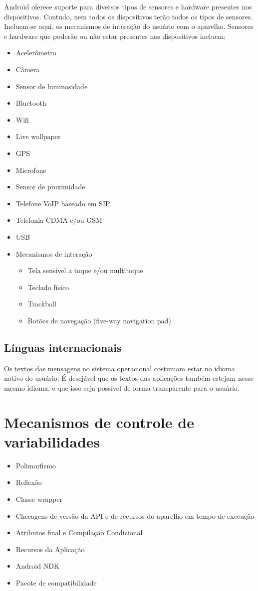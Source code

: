 Android oferece suporte para diversos tipos de sensores e hardware presentes nos 
dispositivos. Contudo, nem todos os dispositivos terão todos os tipos de sensores.
Incluem-se aqui, os mecanismos de interação do usuário com o aparelho.
Sensores e hardware que poderão ou não estar presentes nos dispositivos incluem:
\begin{itemize}
    \item Acelerômetro
    \item Câmera
    \item Sensor de luminosidade
    \item Bluetooth
    \item Wifi
    \item Live wallpaper
    \item GPS
    \item Microfone
    \item Sensor de proximidade
    \item Telefone VoIP baseado em SIP
    \item Telefonia CDMA e/ou GSM
    \item USB
    \item Mecanismos de interação
    \begin{itemize}
        \item Tela sensível a toque e/ou multitoque
        \item Teclado físico
        \item Trackball
        \item Botões de navegação (five-way navigation pad)
    \end{itemize}
\end{itemize}


\subsection{Línguas internacionais}
Os textos das mensagens no sistema operacional costumam estar no idioma nativo do usuário.
É desejável que os textos das aplicações também estejam nesse mesmo idioma, e que 
isso seja possível de forma transparente para o usuário.

\section{Mecanismos de controle de variabilidades}
\begin{itemize}
    \item Polimorfismo
    \item Reflexão
    \item Classe wrapper
    \item Checagens de versão da API e de recursos do aparelho em tempo de execução
    \item Atributos final e Compilação Condicional 
    \item Recursos da Aplicação
    \item Android NDK
    \item Pacote de compatibilidade
\end{itemize}

